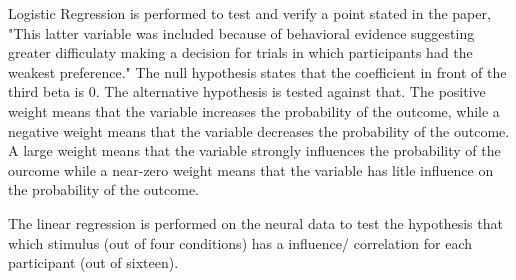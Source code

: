 \par \indent Logistic Regression is performed to test and verify a point stated
in the paper, "This latter variable was included because of behavioral evidence
suggesting greater difficulaty making a decision for trials in which
participants had the weakest preference." The null hypothesis states that the
coefficient in front of the third beta is 0. The alternative hypothesis is 
tested against that. The positive weight means that the variable increases the
probability of the outcome, while a negative weight means that the variable
decreases the probability of the outcome. A large weight means that the variable
strongly influences the probability of the ourcome while a near-zero weight
means that the variable has litle influence on the probability of the outcome.
\par The linear regression is performed on the neural data to test the 
hypothesis that which stimulus (out of four conditions) has a influence/
correlation for each participant (out of sixteen). 




